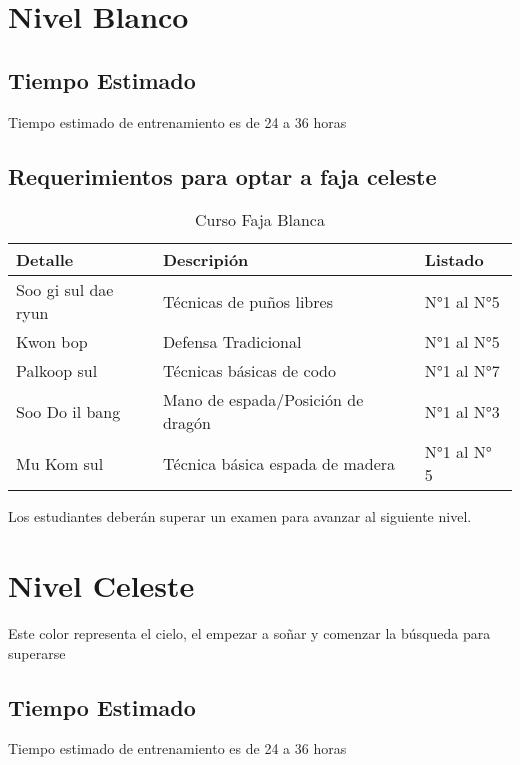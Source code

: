 \section{Nivel Blanco}


\subsection[Duración]{Tiempo Estimado}

Tiempo estimado de entrenamiento es de 24 a 36 horas

\subsection{Requerimientos para optar a faja celeste}


\begin{table}[t]
	\caption{Curso Faja Blanca}
	\begin{center}
		\begin{tabular}{ | m{2cm} | m{5cm} | m{5cm} | }
			\hline Detalle & Descripión & Listado\\ \hline
			Soo gi sul dae ryun & Técnicas de puños libres & N°1 al N°5\\
			Kwon bop & Defensa Tradicional & N°1 al N°5\\
			Palkoop sul & Técnicas básicas de codo & N°1 al N°7\\
			Soo Do il bang & Mano de espada/Posición de dragón & N°1 al N°3\\
			Mu Kom sul & Técnica básica espada de madera & N°1 al N° 5\\ \hline
		\end{tabular}
	\end{center}
\end{table}


Los estudiantes deberán superar un examen para avanzar al siguiente nivel.

\section{Nivel Celeste}

Este color representa el cielo, el empezar a soñar y comenzar la búsqueda para superarse

\subsection[Duración]{Tiempo Estimado}

Tiempo estimado de entrenamiento es de 24 a 36 horas

